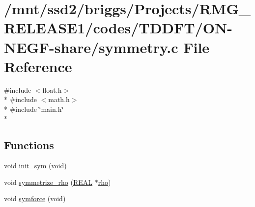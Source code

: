 \hypertarget{_t_d_d_f_t_2_o_n-_n_e_g_f-share_2symmetry_8c}{\section{/mnt/ssd2/briggs/\-Projects/\-R\-M\-G\-\_\-\-R\-E\-L\-E\-A\-S\-E1/codes/\-T\-D\-D\-F\-T/\-O\-N-\/\-N\-E\-G\-F-\/share/symmetry.c File Reference}
\label{_t_d_d_f_t_2_o_n-_n_e_g_f-share_2symmetry_8c}
}
{\ttfamily \#include $<$float.\-h$>$}\\*
{\ttfamily \#include $<$math.\-h$>$}\\*
{\ttfamily \#include \char`\"{}main.\-h\char`\"{}}\\*
\subsection*{Functions}
\begin{DoxyCompactItemize}
\item 
void \hyperlink{_t_d_d_f_t_2_o_n-_n_e_g_f-share_2symmetry_8c_a3c6e919adb4ada8e5948b43afd73f9da}{init\-\_\-sym} (void)
\item 
void \hyperlink{_t_d_d_f_t_2_o_n-_n_e_g_f-share_2symmetry_8c_ad831ceb3f4d5ccfc0e3eb50444964741}{symmetrize\-\_\-rho} (\hyperlink{md_8h_a4b654506f18b8bfd61ad2a29a7e38c25}{R\-E\-A\-L} $\ast$\hyperlink{md_8h_a52b35cee8a5db846ce98f4904e1c8b13}{rho})
\item 
void \hyperlink{_t_d_d_f_t_2_o_n-_n_e_g_f-share_2symmetry_8c_a705a332ea96bf7af5cee048566e67d1f}{symforce} (void)
\end{DoxyCompactItemize}


